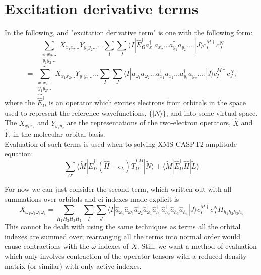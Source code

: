 \documentclass[12pt]{article}
\begin{document}
\section{Excitation derivative terms}
In the following, and "excitation derivative term" is one with the following form:
\begin{equation*}
\sum_{\substack{ x_{1}x_{2}...\\ y_{1}y_{2}... \\ ...}} X_{x_{1}x_{2}...} Y_{y_{1}y_{2}...} ...
\sum_{I}\sum_{J}
\langle I | \hat{E}^{\dagger}_{\Omega} a^{\dagger}_{x_{1}} a_{x_{2}}...a^{\dagger}_{y_{1}}a_{y_{2}}....| J \rangle 
 c^{M \dagger}_{I}c^{N}_{J}
\end{equation*}
\begin{equation}
=
\sum_{\substack{ x_{1}x_{2}...\\ y_{1}y_{2}... \\ ...}} X_{x_{1}x_{2}...} Y_{y_{1}y_{2}...} ...
\sum_{I}\sum_{J}
\langle I | a_{\omega_{1}} a_{\omega_{2}}.. .a^{\dagger}_{x_{1}} a_{x_{2}}...a^{\dagger}_{y_{1}}a_{y_{2}}....| J \rangle 
 c^{M \dagger}_{I}c^{N}_{J},
\label{eqn:basic_2nd_quantized_projector}
\end{equation}
\noindent where the $\hat{E}^{\dagger}_{\Omega}$ is an operator which excites
electrons from orbitals in the space used to represent the reference
wavefunctions, $\{|N\rangle\}$, and into some virtual space. The
$X_{x_{1}x_{2}}$ and  $Y_{y_{1}y_{2}}$ are the representations of the
two-electron operators, $\hat{X}$ and $\hat{Y}$, in the molecular orbital
basis.\\

\noindent Evaluation of such terms is used when to solving XMS-CASPT2 amplitude equation: 
\begin{equation*}
\sum_{\Omega'}
\langle \tilde{M} | \hat{E}^{\dagger}_{\Omega} (\hat{H} - \epsilon_{L}) \hat{T}^{LM}_{\Omega'}| \tilde{N} \rangle 
+
\langle \tilde{M} | \hat{E}^{\dagger}_{\Omega}\hat{H}| \tilde{L} \rangle 
\end{equation*}

\noindent For now we can just consider the second term, which written out with all
summations over orbitals and ci-indexes made explicit is
\begin{equation}
X_{\omega_{1}\omega_{2}\omega_{3}\omega_{4}}
= 
\sum_{ H_{1}H_{2}H_{3}H_{4}} 
\sum_{I}\sum_{J}
\langle I |
\hat{a}_{\omega_{4}} \hat{a}_{\omega_{3}}\hat{a}^{\dagger}_{\omega_{2}}\hat{a}^{\dagger}_{\omega_{1}}
\hat{a}^{\dagger}_{h_{1}} \hat{a}^{\dagger}_{h_{2}}\hat{a}_{h_{3}}\hat{a}_{h_{4}}| J \rangle  
c^{M \dagger}_{I}c^{N}_{J} H_{h_{1}h_{2}h_{3}h_{4}}
\label{eqn:XH_example}
\end{equation}
This cannot be dealt with using the same techniques as terms all the orbital
indexes are summed over; rearranging all the terms into normal order would
cause contractions with the $\omega$ indexes of $X$. Still, we want a method of
evaluation which only involves contraction of the operator tensors with a
reduced density matrix (or similar) with only active indexes.
\end{document}
